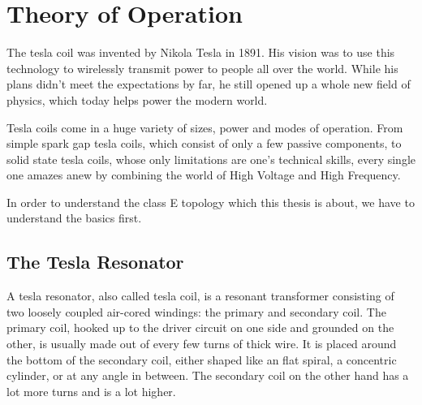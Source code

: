 \chapter{Theory of Operation} %

The tesla coil was invented by Nikola Tesla in 1891. His vision was to use this technology to wirelessly transmit power to people all over the world. While his plans didn't meet the expectations by far, he still opened up a whole new field of physics, which today helps power the modern world.

Tesla coils come in a huge variety of sizes, power and modes of operation. From simple spark gap tesla coils, which consist of only a few passive components, to solid state tesla coils, whose only limitations are one's technical skills, every single one amazes anew by combining the world of High Voltage and High Frequency.

In order to understand the class E topology which this thesis is about, we have to understand the basics first. 

\section{The Tesla Resonator}

A tesla resonator, also called tesla coil, is a resonant transformer consisting of two loosely coupled air-cored windings: the primary and secondary coil. The primary coil, hooked up to the driver circuit on one side and grounded on the other, is usually made out of every few turns of thick wire. It is placed around the bottom of the secondary coil, either shaped like an flat spiral, a concentric cylinder, or at any angle in between. The secondary coil on the other hand has a lot more turns and is a lot higher.

